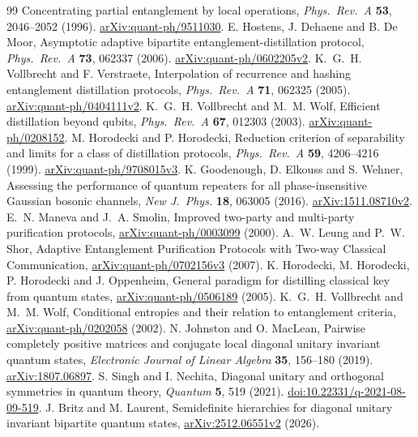 \documentclass[11pt]{article}
\begin{document}
\begin{thebibliography}{99}
Concentrating partial entanglement by local operations,
\emph{Phys.\ Rev.\ A} \textbf{53}, 2046--2052 (1996).
\href{https://arxiv.org/abs/quant-ph/9511030}{arXiv:quant-ph/9511030}.
 E. Hostens, J. Dehaene and B. De Moor,
Asymptotic adaptive bipartite entanglement-distillation protocol,
\emph{Phys.\ Rev.\ A} \textbf{73}, 062337 (2006).
\href{https://arxiv.org/abs/quant-ph/0602205v2}{arXiv:quant-ph/0602205v2}.
 K.~G.~H. Vollbrecht and F. Verstraete,
Interpolation of recurrence and hashing entanglement distillation protocols,
\emph{Phys.\ Rev.\ A} \textbf{71}, 062325 (2005).
\href{https://arxiv.org/abs/quant-ph/0404111v2}{arXiv:quant-ph/0404111v2}.
 K.~G.~H. Vollbrecht and M.~M. Wolf,
Efficient distillation beyond qubits,
\emph{Phys.\ Rev.\ A} \textbf{67}, 012303 (2003).
\href{https://arxiv.org/abs/quant-ph/0208152}{arXiv:quant-ph/0208152}.
 M. Horodecki and P. Horodecki,
Reduction criterion of separability and limits for a class of distillation
protocols, \emph{Phys.\ Rev.\ A} \textbf{59}, 4206--4216 (1999).
\href{https://arxiv.org/abs/quant-ph/9708015v3}{arXiv:quant-ph/9708015v3}.
 K. Goodenough, D. Elkouss and S. Wehner,
Assessing the performance of quantum repeaters for all phase-insensitive
Gaussian bosonic channels, \emph{New J.\ Phys.} \textbf{18}, 063005 (2016).
\href{https://arxiv.org/abs/1511.08710v2}{arXiv:1511.08710v2}.
 E.~N. Maneva and J.~A. Smolin,
Improved two-party and multi-party purification protocols,
\href{https://arxiv.org/abs/quant-ph/0003099}{arXiv:quant-ph/0003099} (2000).
 A.~W. Leung and P.~W. Shor,
Adaptive Entanglement Purification Protocols with Two-way Classical
Communication,
\href{https://arxiv.org/abs/quant-ph/0702156v3}{arXiv:quant-ph/0702156v3} (2007).
 K. Horodecki, M. Horodecki, P. Horodecki and J. Oppenheim,
General paradigm for distilling classical key from quantum states,
\href{https://arxiv.org/abs/quant-ph/0506189}{arXiv:quant-ph/0506189} (2005).
 K.~G.~H. Vollbrecht and M.~M. Wolf,
Conditional entropies and their relation to entanglement criteria,
\href{https://arxiv.org/abs/quant-ph/0202058}{arXiv:quant-ph/0202058} (2002).
 N. Johnston and O. MacLean,
Pairwise completely positive matrices and conjugate local diagonal
unitary invariant quantum states,
\emph{Electronic Journal of Linear Algebra} \textbf{35}, 156--180 (2019).
\href{https://arxiv.org/abs/1807.06897}{arXiv:1807.06897}.
 S. Singh and I. Nechita,
Diagonal unitary and orthogonal symmetries in quantum theory,
\emph{Quantum} \textbf{5}, 519 (2021).
\href{https://doi.org/10.22331/q-2021-08-09-519}{doi:10.22331/q-2021-08-09-519}.
 J. Britz and M. Laurent,
Semidefinite hierarchies for diagonal unitary invariant bipartite
quantum states,
\href{https://arxiv.org/abs/2512.06551v2}{arXiv:2512.06551v2} (2026).


\end{thebibliography}
\end{document}
